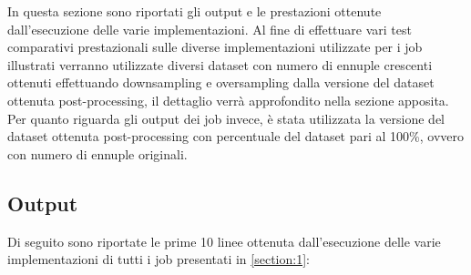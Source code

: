 In questa sezione sono riportati gli output e le prestazioni ottenute dall'esecuzione delle varie implementazioni. Al fine di effettuare vari test comparativi prestazionali sulle diverse implementazioni utilizzate per i job illustrati verranno utilizzate diversi dataset con numero di ennuple crescenti ottenuti effettuando downsampling e oversampling dalla versione del dataset ottenuta post-processing, il dettaglio verrà approfondito nella sezione apposita. Per quanto riguarda gli output dei job invece, è stata utilizzata la versione del dataset ottenuta post-processing con percentuale del dataset pari al 100\%, ovvero con numero di ennuple originali.

\subsection{Output}
Di seguito sono riportate le prime 10 linee ottenuta dall'esecuzione delle varie implementazioni di tutti i job presentati in \ref{section:1}:
